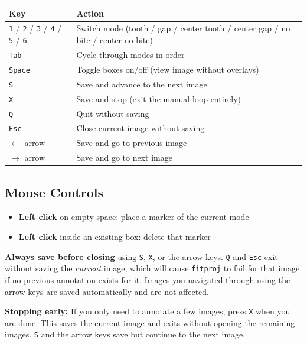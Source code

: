 \documentclass[11pt, letterpaper]{article}
\begin{document}
\begin{center}
\begin{tabular}{ll}
\toprule
\textbf{Key} & \textbf{Action} \\
\midrule
\texttt{1} / \texttt{2} / \texttt{3} / \texttt{4} / \texttt{5} / \texttt{6} & Switch mode (tooth / gap / center tooth / center gap / no bite / center no bite) \\
\texttt{Tab}        & Cycle through modes in order \\
\texttt{Space}      & Toggle boxes on/off (view image without overlays) \\
\texttt{S}          & Save and advance to the next image \\
\texttt{X}          & Save and stop (exit the manual loop entirely) \\
\texttt{Q}          & Quit without saving \\
\texttt{Esc}        & Close current image without saving \\
$\leftarrow$ arrow  & Save and go to previous image \\
$\rightarrow$ arrow & Save and go to next image \\
\bottomrule
\end{tabular}
\end{center}

\subsection*{Mouse Controls}

\begin{itemize}[leftmargin=*]
  \item \textbf{Left click} on empty space: place a marker of the current mode
  \item \textbf{Left click} inside an existing box: delete that marker
\end{itemize}

\begin{warnbox}
\textbf{Always save before closing} using \texttt{S}, \texttt{X}, or the arrow keys.
\texttt{Q} and \texttt{Esc} exit without saving the \emph{current} image, which will
cause \texttt{fitproj} to fail for that image if no previous annotation exists for it.
Images you navigated through using the arrow keys are saved automatically and are not
affected.
\end{warnbox}

\begin{tipbox}
\textbf{Stopping early:} If you only need to annotate a few images, press \texttt{X}
when you are done. This saves the current image and exits without opening the remaining
images. \texttt{S} and the arrow keys save but continue to the next image.
\end{tipbox}
\end{document}
